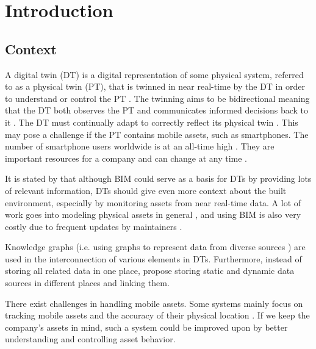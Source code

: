 \documentclass{article}
\begin{document}
\listoffigures
\newpage

\setcounter{page}{1}

\section{Introduction}\label{sec:Introduction}
\subsection{Context}
A digital twin (DT) is a digital representation of some physical system, referred to as a physical twin (PT), that is twinned in near real-time by the DT in order to understand or control the PT \cite{grieves_digital_2017, kamburjan_digital_2022}. The twinning aims to be bidirectional meaning that the DT both observes the PT and communicates informed decisions back to it \cite{kamburjan_digital_2022, fuller_digital_2020}. The DT must continually adapt to correctly reflect its physical twin \cite{kamburjan_twinning-by-construction_2022}. This may pose a challenge if the PT contains mobile assets, such as smartphones. The number of smartphone users worldwide is at an all-time high \cite{petroc_taylor_number_2023}. They are important resources for a company and can change at any time \cite{marcheta_development_2022}. 

It is stated by \citeauthor{godager_concept_2021} that although BIM could serve as a basis for DTs by providing lots of relevant information, DTs should give even more context about the built environment, especially by monitoring assets from near real-time data. A lot of work goes into modeling physical assets in general \cite{waszak_let_2022}, and using BIM is also very costly due to frequent updates by maintainers \cite{hamledari_ifc-based_2018}.

 Knowledge graphs (i.e. using graphs to represent data from diverse sources \cite{hogan_introduction_2022, ryen_building_2022}) are used in the interconnection of various elements in DTs. Furthermore, instead of storing all related data in one place, \citeauthor{waszak_let_2022} propose storing static and dynamic data sources in different places and linking them.

There exist challenges in handling mobile assets. Some systems mainly focus on tracking mobile assets and the accuracy of their physical location \cite{marcheta_development_2022,akram_design_2021}. If we keep the company's assets in mind, such a system could be improved upon by better understanding and controlling asset behavior. 
\end{document}
